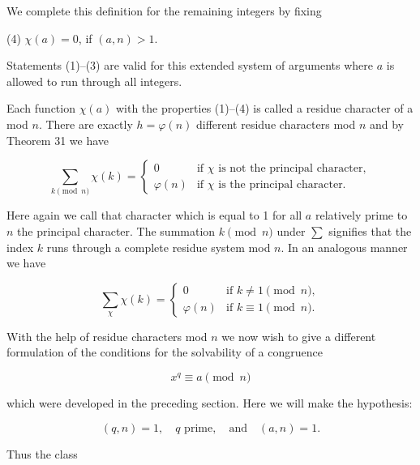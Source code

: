 We complete this definition for the remaining integers by fixing

(4) $\chi(a) = 0$, if $(a,n) > 1$.

Statements (1)–(3) are valid for this extended system of arguments where $a$ is allowed to run through all integers.

Each function $\chi(a)$ with the properties (1)–(4) is called a residue character of a mod $n$. There are exactly $h = \varphi(n)$ different residue characters mod $n$ and by Theorem 31 we have

$$\sum_{k \pmod{n}} \chi(k) = \begin{cases} 0 & \text{if } \chi \text{ is not the principal character}, \\ \varphi(n) & \text{if } \chi \text{ is the principal character.} \end{cases}$$

Here again we call that character which is equal to 1 for all $a$ relatively prime to $n$ the principal character. The summation $k \pmod{n}$ under $\sum$ signifies that the index $k$ runs through a complete residue system mod $n$. In an analogous manner we have

$$\sum_{\chi} \chi(k) = \begin{cases} 0 & \text{if } k \neq 1 \pmod{n}, \\ \varphi(n) & \text{if } k \equiv 1 \pmod{n}. \end{cases}$$

With the help of residue characters mod $n$ we now wish to give a different formulation of the conditions for the solvability of a congruence

$$x^q \equiv a \pmod{n}$$

which were developed in the preceding section. Here we will make the hypothesis:

$$(q,n) = 1, \quad q \text{ prime}, \quad \text{and} \quad (a,n) = 1.$$

Thus the class
